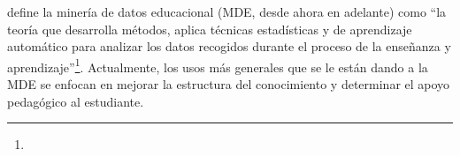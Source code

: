 \textcite[p.~9]{mining2012enhancing} define la minería de datos educacional (MDE, desde ahora en adelante) como “la teoría que desarrolla métodos, aplica técnicas estadísticas y de aprendizaje automático para analizar los datos recogidos durante el proceso de la enseñanza y aprendizaje”\footnote{\traduccionlibre}. Actualmente, los usos más generales que se le están dando a la MDE se enfocan en mejorar la estructura del conocimiento y determinar el apoyo pedagógico al estudiante.